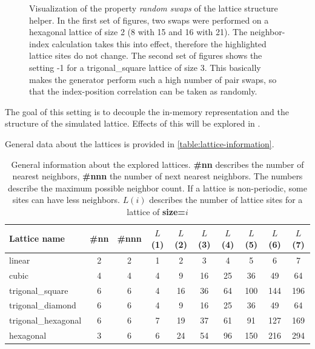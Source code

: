 \begin{figure}[htbp]
    \vspace{0.2cm}
    \caption{Visualization of the property \emph{random swaps} of the lattice structure helper. In the first set of figures, two swaps were performed on a hexagonal lattice of size 2 (8 with 15 and 16 with 21). The neighbor-index calculation takes this into effect, therefore the highlighted lattice sites do not change. The second set of figures shows the setting -1 for a trigonal\_square lattice of size 3. This basically makes the generator perform such a high number of pair swaps, so that the index-position correlation can be taken as randomly. 
    }
    \label{fig:direct-comparison-lattice-site-swaps}
\end{figure}

The goal of this setting is to decouple the in-memory representation and the structure of the simulated lattice. 
Effects of this will be explored in .

General data about the lattices is provided in \autoref{table:lattice-information}.

\begin{table}[htbp]
    \centering
    \begin{tabular}{l|cc|ccccccc} 
        \toprule
        Lattice name & \#nn & \#nnn &$L$(1)&$L$(2)&$L$(3)&$L$(4)&$L$(5)&$L$(6)&$L$(7)\\  
        \midrule 
        linear & 2 & 2 & 1 & 2 & 3 & 4 & 5 & 6 & 7\\
        cubic & 4 & 4 & 4 & 9 & 16 & 25 & 36 & 49 & 64\\
        trigonal\_square & 6 & 6 & 4 & 16 & 36 & 64 & 100 & 144 & 196\\
        trigonal\_diamond & 6 & 6 & 4 & 9 & 16 & 25 & 36 & 49 & 64\\
        trigonal\_hexagonal & 6 & 6 & 7 & 19 & 37 & 61 & 91 & 127 & 169\\
        hexagonal & 3 & 6 & 6 & 24 & 54 & 96 & 150 & 216 & 294\\
        \bottomrule
    \end{tabular}
    \vspace{0.5cm}
    \caption{General information about the explored lattices. \textbf{\#nn} describes the number of nearest neighbors, \textbf{\#nnn} the number of next nearest neighbors. The numbers describe the maximum possible neighbor count. If a lattice is non-periodic, some sites can have less neighbors. $L(i)$ describes the number of lattice sites for a lattice of \textbf{size=$i$}}
    \label{table:lattice-information}
\end{table}




